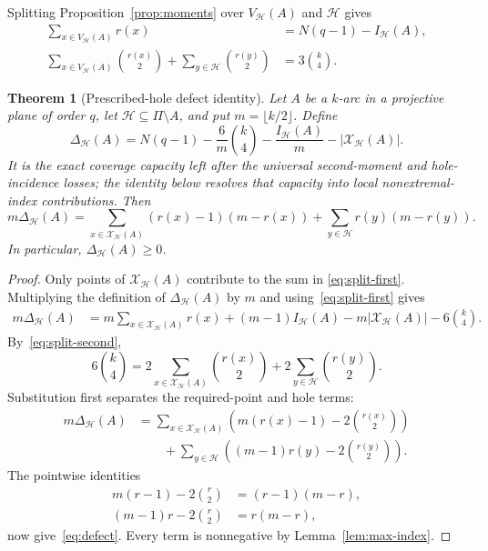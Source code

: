 \documentclass[11pt]{article}
\newtheorem{theorem}{Theorem}[section]
\theoremstyle{definition}
\theoremstyle{remark}
\newcommand{\cH}{\mathcal{H}}
\newcommand{\cX}{\mathcal{X}}
\newcommand{\IH}{I_{\cH}}
\begin{document}
Splitting Proposition~\ref{prop:moments} over $V_{\cH}(A)$ and $\cH$ gives
\begin{align}
 \sum_{x\in V_{\cH}(A)}r(x)
   &=N(q-1)-\IH(A), \label{eq:split-first}\\
 \sum_{x\in V_{\cH}(A)}\binom{r(x)}2
 +\sum_{y\in\cH}\binom{r(y)}2
   &=3\binom{k}{4}. \label{eq:split-second}
\end{align}

\begin{theorem}[Prescribed-hole defect identity]
\label{thm:defect}
Let $A$ be a $k$-arc in a projective plane of order $q$, let
$\cH\subseteq\Pi\setminus A$, and put $m=\lfloor k/2\rfloor$.  Define
\[
 \Delta_{\cH}(A)=
 N(q-1)-\frac{6}{m}\binom{k}{4}
 -\frac{\IH(A)}{m}-|\cX_{\cH}(A)|.
\]
It is the exact coverage capacity left after the universal second-moment and
hole-incidence losses; the identity below resolves that capacity into local
nonextremal-index contributions.
Then
\begin{equation}
\boxed{
 m\Delta_{\cH}(A)=
 \sum_{x\in\cX_{\cH}(A)}(r(x)-1)(m-r(x))
 +\sum_{y\in\cH}r(y)(m-r(y)).
}
\label{eq:defect}
\end{equation}
In particular, $\Delta_{\cH}(A)\ge0$.
\end{theorem}

\begin{proof}
Only points of $\cX_{\cH}(A)$ contribute to the sum in
\eqref{eq:split-first}.  Multiplying the definition of $\Delta_{\cH}(A)$
by $m$ and using~\eqref{eq:split-first} gives
\begin{align*}
 m\Delta_{\cH}(A)
 &=m\sum_{x\in\cX_{\cH}(A)}r(x)
   +(m-1)\IH(A)-m|\cX_{\cH}(A)|
   -6\binom{k}{4}.
\end{align*}
By~\eqref{eq:split-second},
\[
 6\binom{k}{4}=
 2\sum_{x\in\cX_{\cH}(A)}\binom{r(x)}2
 +2\sum_{y\in\cH}\binom{r(y)}2.
\]
Substitution first separates the required-point and hole terms:
\begin{align*}
m\Delta_{\cH}(A)
&=\sum_{x\in\cX_{\cH}(A)}
  \left(m(r(x)-1)-2\binom{r(x)}2\right)\\
&\qquad+\sum_{y\in\cH}
  \left((m-1)r(y)-2\binom{r(y)}2\right).
\end{align*}
The pointwise identities
\begin{align*}
 m(r-1)-2\binom r2&=(r-1)(m-r),\\
 (m-1)r-2\binom r2&=r(m-r),
\end{align*}
now give~\eqref{eq:defect}.  Every term is nonnegative by
Lemma~\ref{lem:max-index}.
\end{proof}
\end{document}
